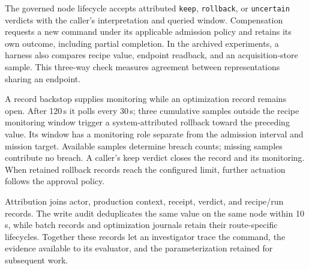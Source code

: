 The governed node lifecycle accepts attributed \texttt{keep},
\texttt{rollback}, or \texttt{uncertain} verdicts with the caller's
interpretation and queried window. Compensation requests a new command
under its applicable admission policy and retains its own outcome,
including partial completion. In the archived experiments, a harness also
compares recipe value, endpoint readback, and an acquisition-store sample.
This three-way check measures agreement between representations sharing an
endpoint.

A record backstop supplies monitoring while an optimization record remains
open. After 120\,s it polls every 30\,s; three cumulative samples outside
the recipe monitoring window trigger a system-attributed rollback toward
the preceding value. Its window has a monitoring role separate from the
admission interval and mission target. Available samples determine breach
counts; missing samples contribute no breach. A caller's keep verdict
closes the record and its monitoring. When retained rollback records reach
the configured limit, further actuation follows the approval policy.

Attribution joins actor, production context, receipt, verdict, and
recipe/run records. The write audit deduplicates the same value on the same
node within 10\,s, while batch records and optimization journals retain
their route-specific lifecycles. Together these records let an investigator
trace the command, the evidence available to its evaluator, and the
parameterization retained for subsequent work.

